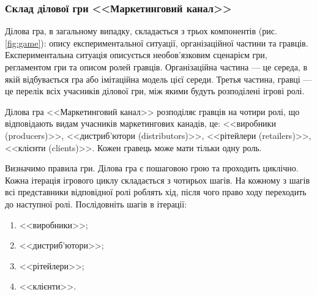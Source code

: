 \subsubsection{Склад ділової гри <<Маркетинговий канал>>}
Ділова гра, в загальному випадку, складається з трьох компонентів (рис. \ref{fig:game}): опису експериментальної ситуації, організаційної частини та гравців. Експериментальна ситуація описується необов’язковим сценарієм гри, регламентом гри та описом ролей гравців. Організаційна частина --- це середа, в якій відбувається гра або імітаційна модель цієї середи. Третья частина, гравці --- це перелік всіх учасників ділової гри, між якими будуть розподілені ігрові ролі.

Ділова гра <<Маркетинговий канал>> розподіляє гравців на чотири ролі, що відповідають видам учасників маркетингових канадів, це: <<виробники (producers)>>, <<дистриб’ютори (distributors)>>, <<рітейлери (retailers)>>, <<клієнти (clients)>>. Кожен гравець може мати тільки одну роль.

Визначимо правила гри. Ділова гра є пошаговою грою та проходить циклічно. Кожна ітерація ігрового циклу складається з чотирьох шагів. На кожному з шагів всі представники відповідної ролі роблять хід, після чого право ходу переходить до наступної ролі. Послідовніть шагів в ітерації:
\begin{enumerate}
\item <<виробники>>;
\item <<дистриб’ютори>>;
\item <<рітейлери>>;
\item <<клієнти>>.
\end{enumerate}

